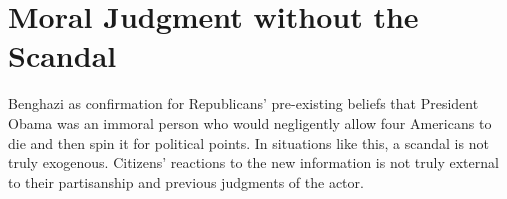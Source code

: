 %


\section{Moral Judgment without the Scandal}
Benghazi as confirmation for Republicans' pre-existing beliefs that President Obama was an immoral person who would negligently allow four Americans to die and then spin it for political points. In situations like this, a scandal is not truly exogenous. Citizens' reactions to the new information is not truly external to their partisanship and previous judgments of the actor.


